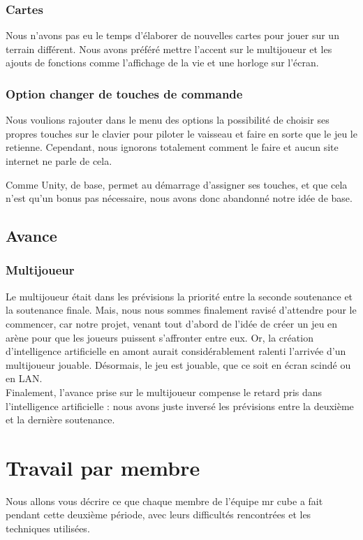 \documentclass[10pt, titlepage]{report}
\begin{document}
\subsection{Cartes}
Nous n'avons pas eu le temps d'élaborer de nouvelles cartes pour jouer sur un terrain différent. Nous avons préféré mettre l'accent sur le multijoueur et les ajouts de fonctions comme l'affichage de la vie et une horloge sur l'écran.\\

\subsection{Option changer de touches de commande}

Nous voulions rajouter dans le menu des options la possibilité de choisir ses propres touches sur le clavier pour piloter le vaisseau et faire en sorte que le jeu le retienne. Cependant, nous ignorons totalement comment le faire et aucun site internet ne parle de cela.

Comme Unity, de base, permet au démarrage d'assigner ses touches, et que cela n'est qu'un bonus pas nécessaire, nous avons donc abandonné notre idée de base.\\

\section{Avance}

\subsection{Multijoueur}
Le multijoueur était dans les prévisions la priorité entre la seconde soutenance et la soutenance finale. Mais, nous nous sommes finalement ravisé d'attendre pour le commencer, car notre projet, venant tout d'abord de l'idée de créer un jeu en arène pour que les joueurs puissent s'affronter entre eux. Or, la création d'intelligence artificielle en amont aurait considérablement ralenti l'arrivée d'un multijoueur jouable. Désormais, le jeu est jouable, que ce soit en écran scindé ou en LAN.\\

Finalement, l'avance prise sur le multijoueur compense le retard pris dans l'intelligence artificielle : nous avons juste inversé les prévisions entre la deuxième et la dernière soutenance.

\chapter{Travail par membre}
Nous allons vous décrire ce que chaque membre de l'équipe mr cube a fait pendant cette deuxième période, avec leurs difficultés rencontrées et les techniques utilisées.
\end{document}
